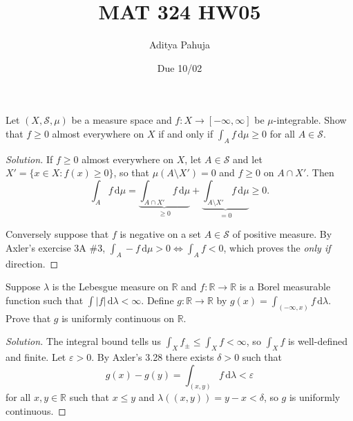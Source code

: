 \documentclass[10pt]{article}
\title{MAT 324 HW05}
\author{\large Aditya Pahuja}
\date{\large Due 10/02}
\newcommand{\dd}{\,\mathrm{d}}
\providecommand{\eps}{\varepsilon}
\providecommand{\RR}{\mathbb R}
\newenvironment{soln}{\begin{proof}[Solution]}{\end{proof}}
\providecommand{\abs}[1]{\left|#1\right|}
\begin{document}
\maketitle

\begin{problem}
    Let $(X,\mathcal S,\mu)$ be a measure space and
    $f\colon X\to[-\infty,\infty]$ be $\mu$-integrable.
    Show that $f\ge 0$ almost everywhere on $X$ if and only if
    $\int_A f\dd\mu\ge 0$ for all $A\in\mathcal S$.
\end{problem}

\begin{soln}
    If $f\ge 0$ almost everywhere on $X$, let $A\in\mathcal S$
    and let $X' = \{x\in X : f(x) \ge 0\}$, so that $\mu(A\setminus X') = 0$
    and $f\ge 0$ on $A\cap X'$. Then
    \begin{equation*}
	\int_Af\dd\mu = \underbrace{\int_{A\cap X'}f\dd\mu}_{\ge0}
	+ \underbrace{\int_{A\setminus X'}f\dd\mu}_{=0} \ge 0.
    \end{equation*}

    Conversely suppose that $f$ is negative on
    a set $A\in\mathcal S$ of positive measure.
    By Axler's exercise 3A \#3, $\int_A-f\dd\mu > 0 \iff \int_Af < 0$,
    which proves the \emph{only if} direction.
\end{soln}

\begin{problem}
    [Axler 3B \#3]
    Suppose $\lambda$ is the Lebesgue measure on $\RR$
    and $f\colon\RR\to\RR$ is a Borel measurable function such that
    $\int\abs f\dd\lambda < \infty$. Define $g\colon\RR\to\RR$ by
    $g(x) = \int_{(-\infty,x)}f\dd\lambda$.
    Prove that $g$ is uniformly continuous on $\RR$.
\end{problem}

\begin{soln}
    The integral bound tells us $\int_X f_\pm \le \int_Xf < \infty$,
    so $\int_Xf$ is well-defined and finite.
    Let $\eps>0$. By Axler's 3.28 there exists $\delta>0$ such that
    \begin{equation*}
	g(x) - g(y) = \int_{(x,y)} f\dd\lambda < \eps
    \end{equation*}
    for all $x,y\in\RR$ such that $x\le y$ and $\lambda((x,y)) = y-x<\delta$,
    so $g$ is uniformly continuous.
\end{soln}

\pagebreak
\end{document}
